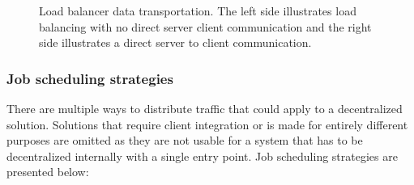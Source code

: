 \begin{figure}
	\centering
	\scalebox{0.7}{}
	\scalebox{0.7}{}
	\caption[Load balancer data transportation]{
		\label{fig:LoadbalancerOperation} 
		\footnotesize{%
			Load balancer data transportation. The left side illustrates load balancing with no direct server client communication and the right side illustrates a direct server to client communication.
		}
	}
\end{figure}


\subsubsection{Job scheduling strategies} %
There are multiple ways to distribute traffic that could apply to a decentralized solution.
Solutions that require client integration or is made for entirely different purposes are omitted as they are not usable for a system that has to be decentralized internally with a single entry point.
Job scheduling strategies are presented below:

